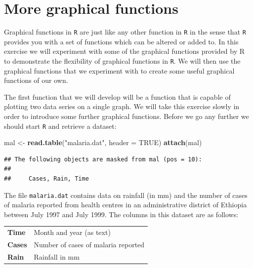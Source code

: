 \documentclass[12pt,]{book}
\newenvironment{Shaded}{\begin{snugshade}}{\end{snugshade}}
\newcommand{\KeywordTok}[1]{\textcolor[rgb]{0.13,0.29,0.53}{\textbf{#1}}}
\newcommand{\DataTypeTok}[1]{\textcolor[rgb]{0.13,0.29,0.53}{#1}}
\newcommand{\StringTok}[1]{\textcolor[rgb]{0.31,0.60,0.02}{#1}}
\newcommand{\OtherTok}[1]{\textcolor[rgb]{0.56,0.35,0.01}{#1}}
\newcommand{\NormalTok}[1]{#1}
\theoremstyle{definition}
\theoremstyle{definition}
\theoremstyle{definition}
\theoremstyle{remark}
\begin{document}
\hypertarget{exercise8}{%
\chapter{More graphical functions}\label{exercise8}}

Graphical functions in \texttt{R} are just like any other function in
\texttt{R} in the sense that \texttt{R} provides you with a set of
functions which can be altered or added to. In this exercise we will
experiment with some of the graphical functions provided by R to
demonstrate the flexibility of graphical functions in \texttt{R}. We
will then use the graphical functions that we experiment with to create
some useful graphical functions of our own.

The first function that we will develop will be a function that is
capable of plotting two data series on a single graph. We will take this
exercise slowly in order to introduce some further graphical functions.
Before we go any further we should start \texttt{R} and retrieve a
dataset:

\begin{Shaded}
\begin{Highlighting}[]
\NormalTok{mal <-}\StringTok{ }\KeywordTok{read.table}\NormalTok{(}\StringTok{"malaria.dat"}\NormalTok{, }\DataTypeTok{header =} \OtherTok{TRUE}\NormalTok{)}
\KeywordTok{attach}\NormalTok{(mal)}
\end{Highlighting}
\end{Shaded}

\begin{verbatim}
## The following objects are masked from mal (pos = 10):
## 
##     Cases, Rain, Time
\end{verbatim}

The file \texttt{malaria.dat} contains data on rainfall (in mm) and the
number of cases of malaria reported from health centres in an
administrative district of Ethiopia between July 1997 and July 1999. The
columns in this dataset are as follows:

\begin{longtable}[]{@{}ll@{}}
\toprule
\begin{minipage}[t]{0.14\columnwidth}\raggedright
\textbf{Time}\strut
\end{minipage} & \begin{minipage}[t]{0.54\columnwidth}\raggedright
Month and year (as text)\strut
\end{minipage}\tabularnewline
\begin{minipage}[t]{0.14\columnwidth}\raggedright
\textbf{Cases}\strut
\end{minipage} & \begin{minipage}[t]{0.54\columnwidth}\raggedright
Number of cases of malaria reported\strut
\end{minipage}\tabularnewline
\begin{minipage}[t]{0.14\columnwidth}\raggedright
\textbf{Rain}\strut
\end{minipage} & \begin{minipage}[t]{0.54\columnwidth}\raggedright
Rainfall in mm\strut
\end{minipage}\tabularnewline
\bottomrule
\end{longtable}
\end{document}
